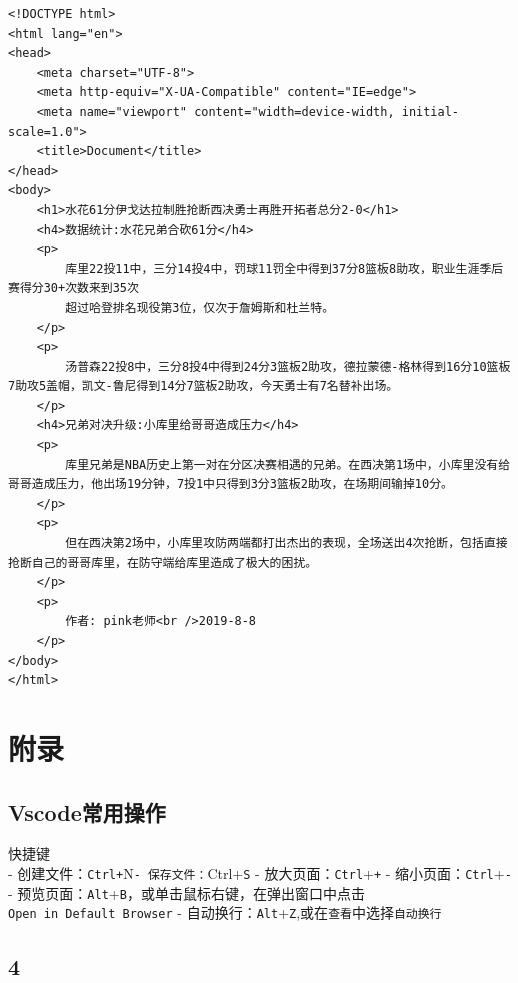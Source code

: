 \documentclass[
]{book}
\begin{document}
\begin{verbatim}
<!DOCTYPE html>
<html lang="en">
<head>
    <meta charset="UTF-8">
    <meta http-equiv="X-UA-Compatible" content="IE=edge">
    <meta name="viewport" content="width=device-width, initial-scale=1.0">
    <title>Document</title>
</head>
<body>
    <h1>水花61分伊戈达拉制胜抢断西决勇士再胜开拓者总分2-0</h1>
    <h4>数据统计:水花兄弟合砍61分</h4>
    <p>
        库里22投11中，三分14投4中，罚球11罚全中得到37分8篮板8助攻，职业生涯季后赛得分30+次数来到35次
        超过哈登排名现役第3位，仅次于詹姆斯和杜兰特。
    </p>   
    <p>
        汤普森22投8中，三分8投4中得到24分3篮板2助攻，德拉蒙德-格林得到16分10篮板7助攻5盖帽，凯文-鲁尼得到14分7篮板2助攻，今天勇士有7名替补出场。
    </p>
    <h4>兄弟对决升级:小库里给哥哥造成压力</h4>
    <p>
        库里兄弟是NBA历史上第一对在分区决赛相遇的兄弟。在西决第1场中，小库里没有给哥哥造成压力，他出场19分钟，7投1中只得到3分3篮板2助攻，在场期间输掉10分。
    </p>
    <p>
        但在西决第2场中，小库里攻防两端都打出杰出的表现，全场送出4次抢断，包括直接抢断自己的哥哥库里，在防守端给库里造成了极大的困扰。
    </p>
    <p>
        作者: pink老师<br />2019-8-8
    </p>
</body>
</html>
\end{verbatim}

\hypertarget{part-ux9644ux5f55}{%
\part{附录}\label{part-ux9644ux5f55}}

\hypertarget{vscodeux5e38ux7528ux64cdux4f5c}{%
\chapter{Vscode常用操作}\label{vscodeux5e38ux7528ux64cdux4f5c}}

快捷键\\
- 创建文件：\texttt{Ctrl+}N\texttt{-\ 保存文件：}Ctrl+\texttt{S}
- 放大页面：\texttt{Ctrl}+\texttt{+}
- 缩小页面：\texttt{Ctrl}+\texttt{-}
- 预览页面：\texttt{Alt}+\texttt{B}，或单击鼠标右键，在弹出窗口中点击\texttt{Open\ in\ Default\ Browser}
- 自动换行：\texttt{Alt}+\texttt{Z},或在\texttt{查看}中选择\texttt{自动换行}

\hypertarget{section}{%
\chapter{4}\label{section}}

\printbibliography
\end{document}
